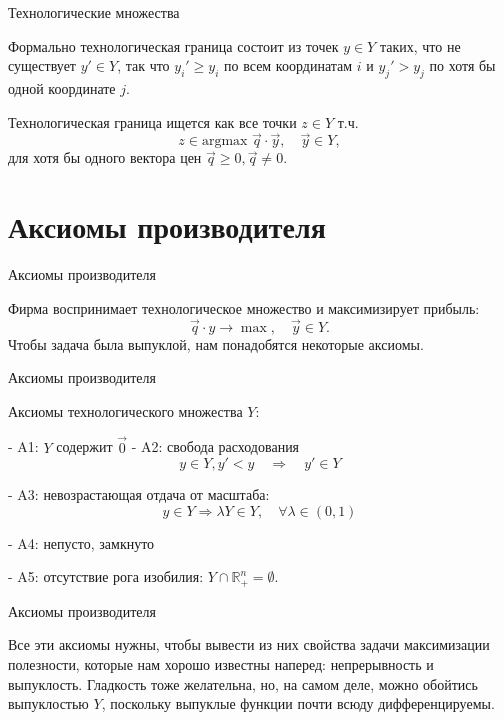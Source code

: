 \documentclass{beamer}
\begin{document}
\begin{frame}{Технологические множества}

Формально технологическая граница состоит из точек $y \in Y$ таких, что не существует $y' \in Y$, так что $y_i' \geqslant y_i$ по всем координатам $i$ и $y_j' > y_j$ по хотя бы одной координате $j$.

\begin{lemma}
Технологическая граница ищется как все точки $z \in Y$ т.ч.
$$ z \in \text{argmax } \vec q \cdot \vec y, \quad \vec y \in Y,$$
для хотя бы одного вектора цен $\vec q \geqslant 0, \vec q \neq 0$.
\end{lemma}
\end{frame}

\section{Аксиомы производителя}

\begin{frame}{Аксиомы производителя}

Фирма воспринимает технологическое множество и максимизирует прибыль:
$$ \vec q \cdot y \to \max, \quad \vec y \in Y.$$
Чтобы задача была выпуклой, нам понадобятся некоторые аксиомы.

\end{frame}

\begin{frame}{Аксиомы производителя}

\begin{definition}
Аксиомы технологического множества $Y$:

- A1: $Y$ содержит $\vec{0}$
- A2: свобода расходования
$$ y \in Y, y' < y \quad \Rightarrow \quad y' \in Y$$

- A3: невозрастающая отдача от масштаба:
$$y \in Y \Rightarrow \lambda Y \in Y, \quad \forall \lambda \in (0,1)$$

- A4: непусто, замкнуто

- A5: отсутствие рога изобилия: $Y \cap \mathbb{R}^n_{+} = \emptyset$.
\end{definition}

\end{frame}

\begin{frame}{Аксиомы производителя}

Все эти аксиомы нужны, чтобы вывести из них свойства задачи максимизации полезности, которые нам хорошо известны наперед: непрерывность и выпуклость. Гладкость тоже желательна, но, на самом деле, можно обойтись выпуклостью $Y$, поскольку выпуклые функции почти всюду дифференцируемы.

\end{frame}
\end{document}
